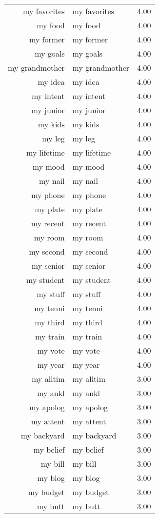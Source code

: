 \begin{table}[ht]
\begin{tabular}{rlr}
  my favorites & my favorites & 4.00 \\ 
  my food & my food & 4.00 \\ 
  my former & my former & 4.00 \\ 
  my goals & my goals & 4.00 \\ 
  my grandmother & my grandmother & 4.00 \\ 
  my idea & my idea & 4.00 \\ 
  my intent & my intent & 4.00 \\ 
  my junior & my junior & 4.00 \\ 
  my kids & my kids & 4.00 \\ 
  my leg & my leg & 4.00 \\ 
  my lifetime & my lifetime & 4.00 \\ 
  my mood & my mood & 4.00 \\ 
  my nail & my nail & 4.00 \\ 
  my phone & my phone & 4.00 \\ 
  my plate & my plate & 4.00 \\ 
  my recent & my recent & 4.00 \\ 
  my room & my room & 4.00 \\ 
  my second & my second & 4.00 \\ 
  my senior & my senior & 4.00 \\ 
  my student & my student & 4.00 \\ 
  my stuff & my stuff & 4.00 \\ 
  my tenni & my tenni & 4.00 \\ 
  my third & my third & 4.00 \\ 
  my train & my train & 4.00 \\ 
  my vote & my vote & 4.00 \\ 
  my year & my year & 4.00 \\ 
  my alltim & my alltim & 3.00 \\ 
  my ankl & my ankl & 3.00 \\ 
  my apolog & my apolog & 3.00 \\ 
  my attent & my attent & 3.00 \\ 
  my backyard & my backyard & 3.00 \\ 
  my belief & my belief & 3.00 \\ 
  my bill & my bill & 3.00 \\ 
  my blog & my blog & 3.00 \\ 
  my budget & my budget & 3.00 \\ 
  my butt & my butt & 3.00 \\ 

\end{tabular}
\end{table}
